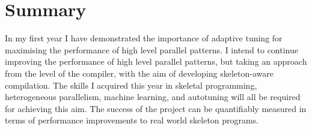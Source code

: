 \documentclass[11pt]{article}
\begin{document}
\section{Summary}

In my first year I have demonstrated the importance of adaptive tuning
for maximising the performance of high level parallel patterns. I
intend to continue improving the performance of high level parallel
patterns, but taking an approach from the level of the compiler, with
the aim of developing skeleton-aware compilation. The skills I
acquired this year in skeletal programming, heterogeneous parallelism,
machine learning, and autotuning will all be required for achieving
this aim. The success of the project can be quantifiably measured in
terms of performance improvements to real world skeleton programs.


\label{bibliography}
\printbibliography
\end{document}
